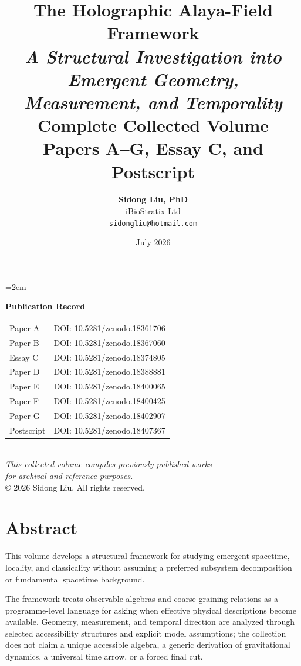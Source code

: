 \documentclass[12pt,a4paper,openany]{book}
\title{
  \vspace{-2cm}
  {\Huge\textbf{The Holographic Alaya-Field Framework}}\\[1cm]
  {\Large\textit{A Structural Investigation into Emergent Geometry,\\ Measurement, and Temporality}}\\[2cm]
  {\large Complete Collected Volume}\\[0.5cm]
  {\normalsize Papers A--G, Essay C, and Postscript}
}
\author{
  \textbf{Sidong Liu, PhD}\\[0.5em]
  iBioStratix Ltd\\[0.3em]
  \texttt{sidongliu@hotmail.com}
}
\date{July 2026}
\begin{document}
\emergencystretch=2em
\raggedbottom
{}

\frontmatter
\maketitle

\newpage
\thispagestyle{empty}
\vspace*{\fill}
\begin{center}
\textbf{Publication Record}\\[2em]
\begin{tabular}{ll}
Paper A & DOI: 10.5281/zenodo.18361706 \\
Paper B & DOI: 10.5281/zenodo.18367060 \\
Essay C & DOI: 10.5281/zenodo.18374805 \\
Paper D & DOI: 10.5281/zenodo.18388881 \\
Paper E & DOI: 10.5281/zenodo.18400065 \\
Paper F & DOI: 10.5281/zenodo.18400425 \\
Paper G & DOI: 10.5281/zenodo.18402907 \\
Postscript & DOI: 10.5281/zenodo.18407367 \\
\end{tabular}
\\[3em]
\textit{This collected volume compiles previously published works\\
for archival and reference purposes.}
\\[2em]
\copyright{} 2026 Sidong Liu. All rights reserved.
\end{center}
\vspace*{\fill}

\chapter*{Abstract}

This volume develops a structural framework for studying emergent spacetime, locality, and classicality without assuming a preferred subsystem decomposition or fundamental spacetime background.

The framework treats observable algebras and coarse-graining relations as a programme-level language for asking when effective physical descriptions become available.  Geometry, measurement, and temporal direction are analyzed through selected accessibility structures and explicit model assumptions; the collection does not claim a unique accessible algebra, a generic derivation of gravitational dynamics, a universal time arrow, or a forced final cut.
\end{document}
